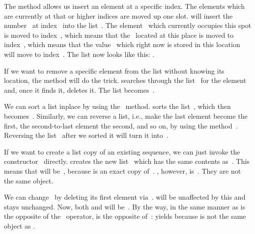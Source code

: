 The  method allows us insert an element at a specific index.
The elements which are currently at that or higher indices are moved up one slot.
 will insert the number~ at index~ into the list~.
The element~ which currently occupies this spot is moved to index~, which means that the~ located at this place is moved to index~, which means that the value~ which right now is stored in this location will move to index~.
The list  now looks like this: \pythonil{[1, 7, 12, 56, 2, 4]}.

If we want to remove a specific element from the list without knowing its location, the  method will do the trick.
 searches through the list~ for the element~ and, once it finds it, deletes it.
The list becomes~\pythonil{[1, 7, 12, 2, 4]}.

We can sort a list inplace by using the~ method.
 sorts the list~, which then becomes~\pythonil{[1, 2, 4, 7, 12]}.
Similarly, we can reverse a list, i.e., make the last element become the first, the second-to-last element the second, and so on, by using the method~.
Reversing the list~ after we sorted it will turn it into~\pythonil{[12, 7, 4, 2, 1]}.

If we want to create a list copy of an existing sequence, we can just invoke the constructor~ directly.
 creates the new list~ which has the same contents as~.
This means that  will be~, because  is an exact copy of~.
, however, is~.
They are not the same object.

We can change~ by deleting its first element via~.
 will be unaffected by this and stays unchanged.
Now, both  and  will be~.
By the way, in the same manner as  is the opposite of the ~operator,  is the opposite of~:
 yields  because  is not the same object as .


